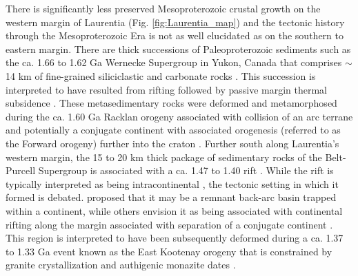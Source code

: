 \documentclass[twocolumn, switch]{article} %
\begin{document}
There is significantly less preserved Mesoproterozoic crustal growth on the western margin of Laurentia (Fig. \ref{fig:Laurentia_map}) and the tectonic history through the Mesoproterozoic Era is not as well elucidated as on the southern to eastern margin. There are thick successions of Paleoproterozoic sediments such as the ca. 1.66 to 1.62 Ga Wernecke Supergroup in Yukon, Canada that comprises $\sim$14 km of  fine-grained siliciclastic and carbonate rocks \citep{Furlanetto2016a}. This succession is interpreted to have resulted from rifting followed by passive margin thermal subsidence \citep{Furlanetto2016a}. These metasedimentary rocks were deformed and metamorphosed during the ca. 1.60 Ga Racklan orogeny associated with collision of an arc terrane and potentially a conjugate continent with associated orogenesis (referred to as the Forward orogeny) further into the craton \citep{Thorkelson2005a, Furlanetto2013a, Furlanetto2016a}. Further south along Laurentia's western margin, the 15 to 20 km thick package of sedimentary rocks of the Belt-Purcell Supergroup is associated with a ca. 1.47 to 1.40 rift \citep{Evans2000c}. While the rift is typically interpreted as being intracontinental \citep{Lydon2004a}, the tectonic setting in which it formed is debated. \citet{Hoffman1989c} proposed that it may be a remnant back-arc basin trapped within a continent, while others envision it as being associated with continental rifting along the margin associated with separation of a conjugate continent \citep{Jones2015a}. This region is interpreted to have been subsequently deformed during a ca. 1.37 to 1.33 Ga event known as the East Kootenay orogeny that is constrained by granite crystallization and authigenic monazite dates \citep{McMechan1982a, Nesheim2012a, McFarlane2015a}.
\end{document}

